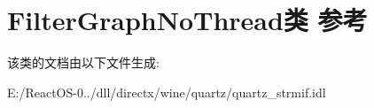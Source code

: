 \hypertarget{class_filter_graph_no_thread}{}\section{Filter\+Graph\+No\+Thread类 参考}
\label{class_filter_graph_no_thread}


该类的文档由以下文件生成\+:\begin{DoxyCompactItemize}
\item 
E\+:/\+React\+O\+S-\/0../dll/directx/wine/quartz/quartz\+\_\+strmif.\+idl\end{DoxyCompactItemize}
